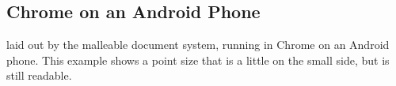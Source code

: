 \begin{center}
\end{center}


\clearpage


\subsection{Chrome on an Android Phone}
\label{app:layout-android}


\cite{Pinkney2011} laid out by the malleable document system, running in Chrome on an Android phone. This example shows a point size that is a little on the small side, but is still readable.

